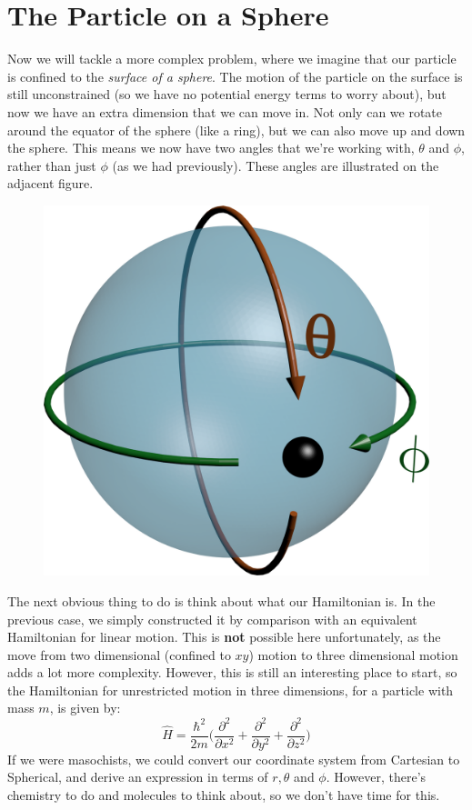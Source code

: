 \documentclass{memoir}[11pt,oneside,a4paper,openany]
\begin{document}
\section{The Particle on a Sphere}
Now we will tackle a more complex problem, where we imagine that our particle is confined to the \emph{surface of a sphere}. The motion of the particle on the surface is still unconstrained (so we have no potential energy terms to worry about), but now we have an extra dimension that we can move in. Not only can we rotate around the equator of the sphere (like a ring), but we can also move up and down the sphere. This means we now have two angles that we're working with, $\theta$ and $\phi$, rather than just $\phi$ (as we had previously). These angles are illustrated on the adjacent figure. 
\begin{figure}
	\centering
	\includegraphics[width=\linewidth]{particle_on_sphere}
\end{figure}

The next obvious thing to do is think about what our Hamiltonian is. In the previous case, we simply constructed it by comparison with an equivalent Hamiltonian for linear motion. This is \textbf{not} possible here unfortunately, as the move from two dimensional (confined to $xy$) motion to three dimensional motion adds a lot more complexity. However, this is still an interesting place to start, so the Hamiltonian for unrestricted motion in three dimensions, for a particle with mass $m$, is given by:
\begin{equation}\label{eq:hamiltonian_3d}
	\hat{H} = \frac{\hbar^2}{2m}\bigg(\frac{\partial^2}{\partial x^2} + \frac{\partial^2}{\partial y^2} + \frac{\partial^2}{\partial z^2}\bigg)
\end{equation}
If we were masochists, we could convert our coordinate system from Cartesian to Spherical, and derive an expression in terms of $r, \theta$ and $\phi$. However, there's chemistry to do and molecules to think about, so we don't have time for this. 
\end{document}
